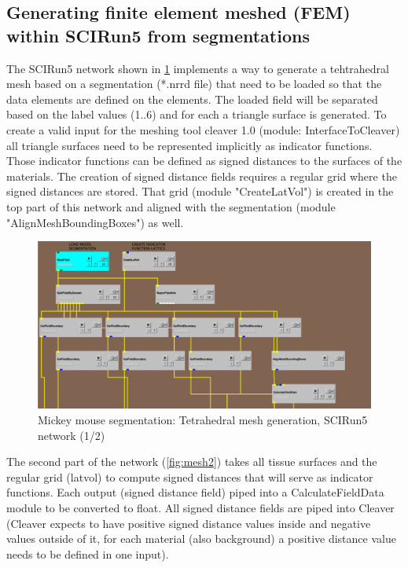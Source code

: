 \documentclass[fleqn,11pt,openany]{book}
\begin{document}
\newpage

\subsection{Generating finite element meshed (FEM) within SCIRun5 from segmentations}
The SCIRun5 network shown in \ref{fig:mesh1} implements a way to generate a tehtrahedral mesh based on a segmentation (*.nrrd file) that need to be loaded so that the data elements
are defined on the elements. The loaded field will be separated based on the label values (1..6) and for each a triangle surface is generated.
To create a valid input for the meshing tool cleaver 1.0 (module: InterfaceToCleaver) all triangle surfaces need to be represented implicitly as indicator functions.
Those indicator functions can be defined as signed distances to the surfaces of the materials. The creation of signed distance fields requires a regular grid where the signed distances are stored.
That grid (module "CreateLatVol") is created in the top part of this network and aligned with the segmentation (module "AlignMeshBoundingBoxes") as well.

\begin{figure}[!h]
\centering
\includegraphics[width=1.0\textwidth]{BrainStimulation_figures/make_mesh1.png}
\caption{ Mickey mouse segmentation: Tetrahedral mesh generation, SCIRun5 network (1/2) }
\label{fig:mesh1}
\end{figure}

The second part of the network (\ref{fig:mesh2}) takes all tissue surfaces and the regular grid (latvol) to compute signed distances that will serve as indicator functions.
Each output (signed distance field) piped into a CalculateFieldData module to be converted to float. All signed distance fields are piped into Cleaver (Cleaver expects to have positive 
signed distance values inside and negative values outside of it, for each material (also background) a positive distance value needs to be defined in one input).
\end{document}
